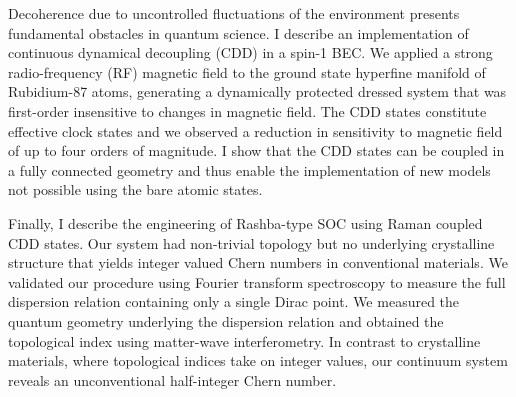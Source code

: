Decoherence due to uncontrolled fluctuations of the environment presents fundamental obstacles in quantum science. I describe an implementation of continuous dynamical decoupling (CDD) in a spin-1 BEC. We applied a strong radio-frequency (RF) magnetic field to the ground state hyperfine manifold of Rubidium-87 atoms, generating a dynamically protected dressed system that was first-order insensitive to changes in magnetic field. The CDD states constitute effective clock states and we observed a reduction in sensitivity to magnetic field of up to four orders of magnitude. I show that the CDD states can be coupled in a fully connected geometry and thus enable the implementation of new models not possible using the bare atomic states. 

Finally, I describe the engineering of Rashba-type SOC using Raman coupled CDD states. Our system had non-trivial topology but no underlying crystalline structure that yields integer valued Chern numbers in conventional materials. We validated our procedure using Fourier transform spectroscopy to measure the full dispersion relation containing only a single Dirac point. We measured the quantum geometry underlying the dispersion relation and obtained the topological index using matter-wave interferometry. In contrast to crystalline materials, where topological indices take on integer values, our continuum system reveals an unconventional half-integer Chern number. 
